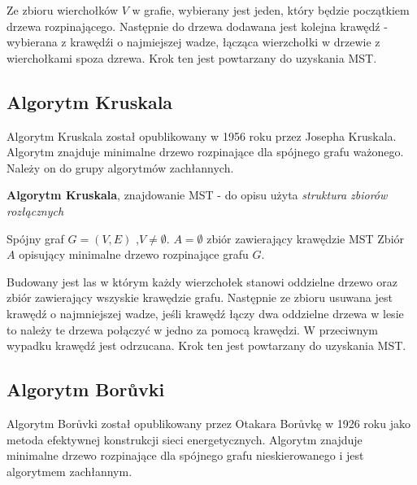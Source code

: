 \documentclass[a4paper, 10pt]{article}
\begin{document}
 Ze zbioru wierchołków $V$ w grafie, wybierany jest jeden, który będzie początkiem drzewa rozpinającego. Następnie do drzewa dodawana jest   
kolejna krawędź - wybierana z krawędźi o najmiejszej wadze, łącząca wierzchołki w drzewie z wierchołkami spoza dzrewa. Krok ten jest powtarzany do uzyskania MST.

	
	\subsection{Algorytm Kruskala}
	

Algorytm Kruskala został opublikowany w 1956 roku przez Josepha Kruskala. Algorytm znajduje minimalne drzewo rozpinające dla spójnego grafu ważonego. Należy
on do grupy algorytmów zachłannych. 

\begin{algorithm}
\caption{{\bf Algorytm Kruskala}, znajdowanie MST - do opisu użyta \textit{struktura zbiorów rozłącznych}}
\begin{algorithmic}[!h]
\REQUIRE Spójny graf $G=(V,E)$ ,$V \neq \emptyset$. 
\ENSURE $A=\emptyset$ zbiór zawierający krawędzie MST
\ENDFOR 
{}
\ENDIF
\ENDFOR 
\RETURN Zbiór $A$ opisujący minimalne drzewo rozpinające grafu $G$.
\end{algorithmic}
\end{algorithm}
\FloatBarrier

Budowany jest las w którym każdy wierzchołek stanowi oddzielne drzewo oraz zbiór zawierający wszyskie krawędzie grafu.
Następnie ze zbioru usuwana jest krawędź o najmniejszej wadze, jeśli krawędź łączy dwa oddzielne drzewa w lesie	to należy te drzewa połączyć w jedno za pomocą
krawędzi. W przeciwnym wypadku krawędź jest odrzucana. Krok ten jest powtarzany do uzyskania MST.

	\subsection{Algorytm Borůvki}
	

Algorytm Borůvki został opublikowany przez Otakara Borůvkę w 1926 roku jako metoda efektywnej konstrukcji sieci 
energetycznych. Algorytm znajduje minimalne drzewo rozpinające dla spójnego grafu nieskierowanego i jest algorytmem zachłannym.
\end{document}
